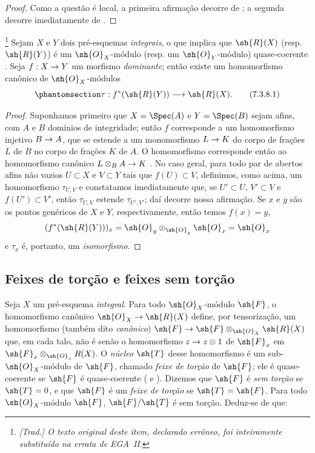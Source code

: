 \documentclass[oneside]{amsart}
\makeatletter
\newcommand{\ega@arrow}[2]{\mathchoice{#1}{#2}{#2}{#2}}
\renewcommand{\to}{\ega@arrow{\longrightarrow}{\rightarrow}}
\let\EGAOriginalLabel\label
\renewcommand{\label}[1]{\phantomsection\EGAOriginalLabel{#1}}
\makeatother
\begin{document}
\begin{proof}
Como a questão é local, a primeira afirmação decorre de ; a segunda decorre imediatamente de .
\end{proof}

\begin{env}[7.3.8]
\label{I.7.3.8}
\footnote{\emph{[Trad.] O texto original deste item, declarado errôneo, foi inteiramente substituído na errata de EGA~II.}}
Sejam $X$ e $Y$ dois pré-esquemas \emph{integrais}, o que implica que $\sh{R}(X)$ (resp. $\sh{R}(Y)$) é um $\sh{O}_X$-módulo (resp. um $\sh{O}_Y$-módulo) quase-coerente .
Seja $f:X\to Y$ um morfismo \emph{dominante}; então existe um homomorfismo canônico de $\sh{O}_X$-módulos
\[
\label{I.7.3.8.1}
  \tau:f^*(\sh{R}(Y))\to\sh{R}(X).
  \tag{7.3.8.1}
\]
\end{env}

\begin{proof}
Suponhamos primeiro que $X=\Spec(A)$ e $Y=\Spec(B)$ sejam afins, com $A$ e $B$ domínios de integridade; então $f$ corresponde a um homomorfismo injetivo $B\to A$, que se estende a um monomorfismo $L\to K$ do corpo de frações $L$ de $B$ no corpo de frações $K$ de $A$.
O homomorfismo  corresponde então ao homomorfismo canônico $L\otimes_B A\to K$ .
No caso geral, para todo par de abertos afins não vazios $U\subset X$ e $V\subset Y$ tais que $f(U)\subset V$, definimos, como acima, um homomorfismo $\tau_{U,V}$ e constatamos imediatamente que, se $U'\subset U$, $V'\subset V$ e $f(U')\subset V'$, então $\tau_{U,V}$ estende $\tau_{U',V'}$; daí decorre nossa afirmação.
Se $x$ e $y$ são os pontos genéricos de $X$ e $Y$, respectivamente, então temos $f(x)=y$,
\[
  (f^*(\sh{R}(Y)))_x=\sh{O}_y\otimes_{\sh{O}_y}\sh{O}_x=\sh{O}_x
\]
 e $\tau_x$ é, portanto, um \emph{isomorfismo}.
\end{proof}

\subsection{Feixes de torção e feixes sem torção}
\label{subsection:I.7.4}
\label{I.7.4}

\begin{env}[7.4.1]
\label{I.7.4.1}
Seja $X$ um pré-esquema \emph{integral}.
Para todo $\sh{O}_X$-módulo $\sh{F}$, o homomorfismo canônico $\sh{O}_X\to\sh{R}(X)$ define, por tensorização, um homomorfismo (também dito \emph{canônico}) $\sh{F}\to\sh{F}\otimes_{\sh{O}_X}\sh{R}(X)$ que, em cada talo, não é senão o homomorfismo $z\to z\otimes1$ de $\sh{F}_x$ em $\sh{F}_x\otimes_{\sh{O}_x}R(X)$.
O \emph{núcleo $\sh{T}$} desse homomorfismo é um sub-$\sh{O}_X$-módulo de $\sh{F}$, chamado \emph{feixe de torção} de $\sh{F}$; ele é quase-coerente se $\sh{F}$ é quase-coerente ( e ).
Dizemos que $\sh{F}$ é \emph{sem torção} se $\sh{T}=0$, e que $\sh{F}$ é um \emph{feixe de torção} se $\sh{T}=\sh{F}$.
Para todo $\sh{O}_X$-módulo $\sh{F}$, $\sh{F}/\sh{T}$ é sem torção.
Deduz-se de  que:
\end{env}
\end{document}
